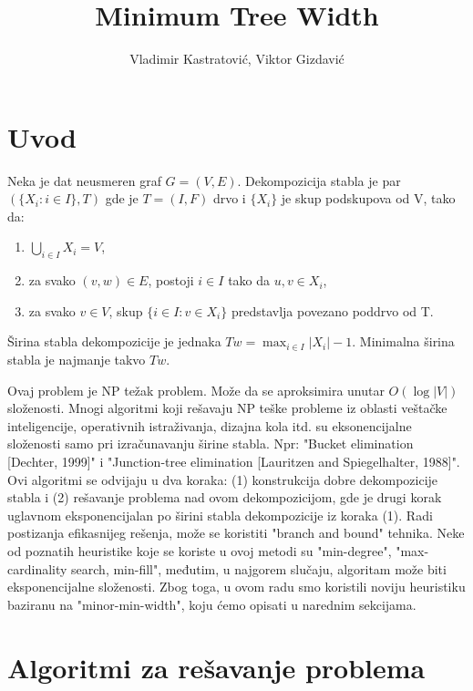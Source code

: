 \documentclass[10pt]{article}
\title{Minimum Tree Width}
\author{Vladimir Kastratović, Viktor Gizdavić}
\begin{document}
    \maketitle

\renewcommand{\contentsname}{Sadržaj}
\tableofcontents

\section{Uvod}
Neka je dat neusmeren graf $G=\left(V,E\right)$.
Dekompozicija stabla je par $\left(\{X_i:i\in I\},T\right)$ gde je $T=\left(I,F\right)$ drvo i $\{X_i\}$ je skup podskupova od V, tako da:

\begin{enumerate}
    \item $\bigcup_{i\in I} X_i=V$,
    \item za svako $(v,w)\in E$, postoji $i\in I$ tako da $u,v\in X_i$,
    \item za svako $v\in V$, skup $\{i\in I: v\in X_i\}$ predstavlja povezano poddrvo od T.
\end{enumerate}

Širina stabla dekompozicije je jednaka $Tw = \max_{i \in I} \vert X_i\vert-1$. Minimalna širina stabla je najmanje takvo $Tw$.

Ovaj problem je NP težak problem. Može da se aproksimira unutar $O(\log \vert V\vert)$ složenosti. Mnogi algoritmi koji rešavaju NP teške probleme iz oblasti veštačke inteligencije, operativnih istraživanja, dizajna kola itd. su eksonencijalne složenosti samo pri izračunavanju širine stabla. Npr: "Bucket
elimination [Dechter, 1999]" i "Junction-tree elimination [Lauritzen and Spiegelhalter, 1988]". Ovi algoritmi se odvijaju u dva koraka: (1) konstrukcija dobre dekompozicije stabla i (2) rešavanje problema nad ovom dekompozicijom, gde je drugi korak uglavnom eksponencijalan po širini stabla dekompozicije iz koraka (1). Radi postizanja efikasnijeg rešenja, može se koristiti "branch and bound" tehnika. Neke od poznatih heuristike koje se koriste u ovoj metodi su "min-degree", "max-cardinality search, min-fill", međutim, u najgorem slučaju, algoritam može biti eksponencijalne složenosti. Zbog toga, u ovom radu smo koristili noviju heuristiku baziranu na "minor-min-width", koju ćemo opisati u narednim sekcijama.

\section{Algoritmi za rešavanje problema}
\end{document}
